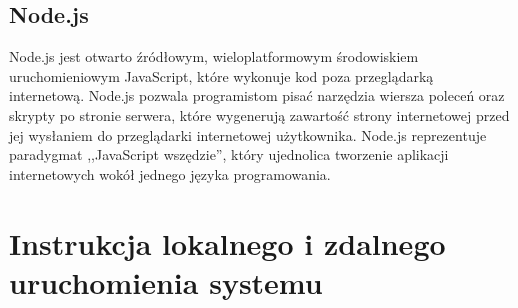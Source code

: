 \documentclass[12pt,a4paper]{article}
\begin{document}
		\subsection{Node.js}
			Node.js jest otwarto źródłowym, wieloplatformowym środowiskiem uruchomieniowym JavaScript, które wykonuje kod poza przeglądarką internetową. Node.js pozwala programistom pisać 					narzędzia wiersza poleceń oraz skrypty po stronie serwera, które wygenerują zawartość strony internetowej przed jej wysłaniem do przeglądarki internetowej użytkownika. Node.js 					reprezentuje paradygmat ,,JavaScript wszędzie'', który ujednolica tworzenie aplikacji internetowych wokół jednego języka programowania. 
		
	\section{Instrukcja lokalnego i zdalnego uruchomienia systemu}
\end{document}
